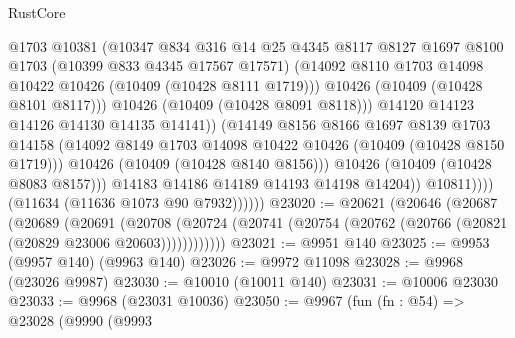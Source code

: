 \begin{lexlean}{RustCore}
\begin{coremodule}
                                @1703
                                @10381
                                (@10347
                                  @834
                                  @316
                                  @14
                                  @25
                                  @4345
                                  @8117
                                  @8127
                                  @1697
                                  @8100
                                  @1703
                                  (@10399 @833 @4345 @17567 @17571)
                                  (@14092
                                    @8110
                                    @1703
                                    @14098
                                    @10422
                                    @10426
                                    (@10409 (@10428 @8111 @1719)))
                                  @10426
                                  (@10409 (@10428 @8101 @8117)))
                                @10426
                                (@10409 (@10428 @8091 @8118)))
                              @14120
                              @14123
                              @14126
                              @14130
                              @14135
                              @14141))
                          (@14149
                            @8156
                            @8166
                            @1697
                            @8139
                            @1703
                            @14158
                            (@14092 @8149 @1703 @14098 @10422 @10426 (@10409 (@10428 @8150 @1719)))
                            @10426
                            (@10409 (@10428 @8140 @8156)))
                          @10426
                          (@10409 (@10428 @8083 @8157)))
                        @14183
                        @14186
                        @14189
                        @14193
                        @14198
                        @14204))
                    @10811))))
            (@11634 (@11636 @1073 @90 @7932))))))
@23020 := @20621
    (@20646
      (@20687
        (@20689
          (@20691
            (@20708
              (@20724 (@20741 (@20754 (@20762 (@20766 (@20821 (@20829 @23006 @20603))))))))))))
@23021 := @9951 @140
@23025 := @9953 (@9957 @140) (@9963 @140)
@23026 := @9972 @11098
@23028 := @9968 (@23026 @9987)
@23030 := @10010 (@10011 @140)
@23031 := @10006 @23030
@23033 := @9968 (@23031 @10036)
@23050 := @9967
    (fun (fn : @54) =>
    @23028
      (@9990
        (@9993

\end{coremodule}
\end{lexlean}

